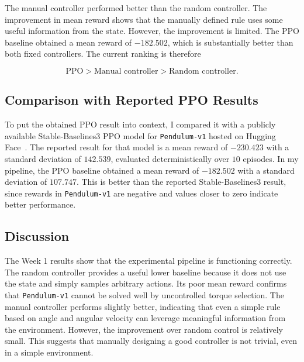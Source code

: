 \documentclass[11pt,a4paper]{article}
\begin{document}
The manual controller performed better than the random controller. The improvement in mean reward shows that the manually defined rule uses some useful information from the state. However, the improvement is limited. The PPO baseline obtained a mean reward of $-182.502$, which is substantially better than both fixed controllers. The current ranking is therefore

\[
\text{PPO} > \text{Manual controller} > \text{Random controller}.
\]

\subsection{Comparison with Reported PPO Results}

To put the obtained PPO result into context, I compared it with a publicly available Stable-Baselines3 PPO model for \texttt{Pendulum-v1} hosted on Hugging Face~\cite{sb3ppo}. The reported result for that model is a mean reward of $-230.423$ with a standard deviation of $142.539$, evaluated deterministically over $10$ episodes.
In my pipeline, the PPO baseline obtained a mean reward of $-182.502$ with a standard deviation of $107.747$. This is better than the reported Stable-Baselines3 result, since rewards in \texttt{Pendulum-v1} are negative and values closer to zero indicate better performance.

\subsection{Discussion}

The Week 1 results show that the experimental pipeline is functioning correctly. The random controller provides a useful lower baseline because it does not use the state and simply samples arbitrary actions. Its poor mean reward confirms that \texttt{Pendulum-v1} cannot be solved well by uncontrolled torque selection. The manual controller performs slightly better, indicating that even a simple rule based on angle and angular velocity can leverage meaningful information from the environment. However, the improvement over random control is relatively small. This suggests that manually designing a good controller is not trivial, even in a simple environment.
\end{document}
